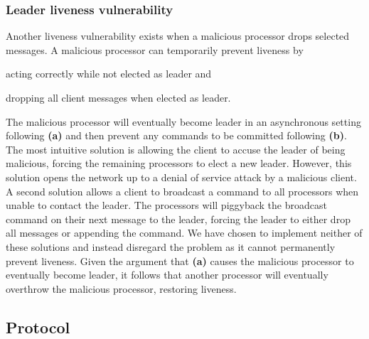 \documentclass{article}
\begin{document}
	\subsubsection*{Leader liveness vulnerability}
	\label{subsub:leader-liveness-vulnerability}

	Another liveness vulnerability exists when a malicious processor drops selected messages.
	A malicious processor can temporarily prevent liveness by
	\begin{enumerate*}[label=\textbf{(\alph*)}]
	  \item acting correctly while not elected as leader and
	  \item dropping all client messages when elected as leader.
	\end{enumerate*}
	The malicious processor will eventually become leader in an asynchronous setting following \textbf{(a)} and then prevent any commands to be committed following \textbf{(b)}.
	The most intuitive solution is allowing the client to accuse the leader of being malicious, forcing the remaining processors to elect a new leader.
	However, this solution opens the network up to a denial of service attack by a malicious client.
	A second solution allows a client to broadcast a command to all processors when unable to contact the leader.
	The processors will piggyback the broadcast command on their next message to the leader, forcing the leader to either drop all messages or appending the command.
	We have chosen to implement neither of these solutions and instead disregard the problem as it cannot permanently prevent liveness.
	Given the argument that \textbf{(a)} causes the malicious processor to eventually become leader, it follows that another processor will eventually overthrow the malicious processor, restoring liveness.

	\subsection{Protocol}
	\label{subsec:protocol}
\end{document}

